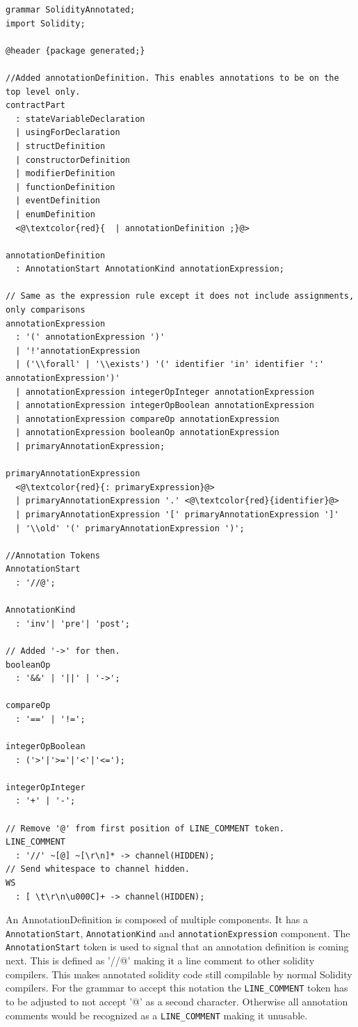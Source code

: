 \documentclass[a4paper]{article}
\begin{document}
\begin{lstlisting}[basicstyle=\ttfamily, breaklines=true]
grammar SolidityAnnotated;
import Solidity;

@header {package generated;}

//Added annotationDefinition. This enables annotations to be on the top level only.
contractPart
  : stateVariableDeclaration
  | usingForDeclaration
  | structDefinition
  | constructorDefinition
  | modifierDefinition
  | functionDefinition
  | eventDefinition
  | enumDefinition 
  <@\textcolor{red}{  | annotationDefinition ;}@>

annotationDefinition
  : AnnotationStart AnnotationKind annotationExpression;

// Same as the expression rule except it does not include assignments, only comparisons
annotationExpression
  : '(' annotationExpression ')'
  | '!'annotationExpression
  | ('\\forall' | '\\exists') '(' identifier 'in' identifier ':' annotationExpression')'
  | annotationExpression integerOpInteger annotationExpression
  | annotationExpression integerOpBoolean annotationExpression
  | annotationExpression compareOp annotationExpression
  | annotationExpression booleanOp annotationExpression
  | primaryAnnotationExpression;

primaryAnnotationExpression
  <@\textcolor{red}{: primaryExpression}@> 
  | primaryAnnotationExpression '.' <@\textcolor{red}{identifier}@> 
  | primaryAnnotationExpression '[' primaryAnnotationExpression ']'
  | '\\old' '(' primaryAnnotationExpression ')';

//Annotation Tokens
AnnotationStart
  : '//@';

AnnotationKind
  : 'inv'| 'pre'| 'post';

// Added '->' for then.
booleanOp
  : '&&' | '||' | '->';

compareOp
  : '==' | '!=';

integerOpBoolean
  : ('>'|'>='|'<'|'<=');

integerOpInteger
  : '+' | '-';

// Remove '@' from first position of LINE_COMMENT token. 
LINE_COMMENT 
  : '//' ~[@] ~[\r\n]* -> channel(HIDDEN);
// Send whitespace to channel hidden.
WS
  : [ \t\r\n\u000C]+ -> channel(HIDDEN);
\end{lstlisting}
An AnnotationDefinition is composed of multiple components. It has a \texttt{AnnotationStart}, \texttt{AnnotationKind} and \texttt{annotationExpression} component. The \texttt{AnnotationStart} token is used to signal that an annotation definition is coming next. This is defined as '//@' making it a line comment to other solidity compilers. This makes annotated solidity code still compilable by normal Solidity compilers. For the grammar to accept this notation the \texttt{LINE\_COMMENT} token has to be adjusted to not accept '@' as a second character. Otherwise all annotation comments would be recognized as a \texttt{LINE\_COMMENT} making it unusable. \par
\end{document}
